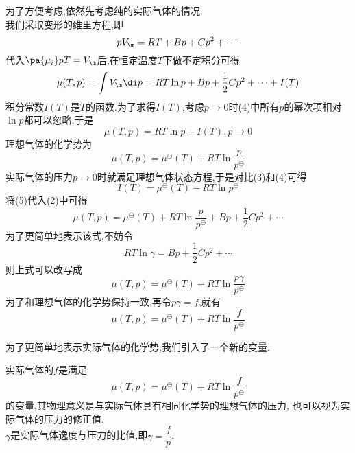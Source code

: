 \documentclass{ctexart}
\begin{document}
\begin{derivation}\setcounter{equation}{0}
    为了方便考虑,依然先考虑纯的实际气体的情况.\\
    我们采取变形的维里方程,即
    \begin{equation}
        pV_{\m}=RT+Bp+Cp^2+\cdots
    \end{equation}
    代入$\pa{\mu_i}pT=V_{\m}$后,在恒定温度$T$下做不定积分可得
    \begin{equation}
        \mu(T,p)=\int{V_\m}\di p=RT\ln p+Bp+\dfrac12Cp^2+\cdots+I(T)
    \end{equation}
    积分常数$I(T)$是$T$的函数.为了求得$I(T)$,考虑$p\to0$时(4)中所有$p$的幂次项相对$\ln p$都可以忽略,于是
    \begin{equation}
        \mu(T,p)=RT\ln p+I(T),p\to0
    \end{equation}
    理想气体的化学势为
    \begin{equation}
        \mu(T,p)=\mu^\ominus(T)+RT\ln\dfrac{p}{p^\ominus}
    \end{equation}
    实际气体的压力$p\to0$时就满足理想气体状态方程,于是对比(3)和(4)可得
    \begin{equation}
        I(T)=\mu^\ominus(T)-RT\ln p^\ominus
    \end{equation}
    将(5)代入(2)中可得
    \begin{equation}
        \mu(T,p)=\mu^\ominus(T)+RT\ln\dfrac{p}{p^\ominus}+Bp+\dfrac12Cp^2+\cdots
    \end{equation}
    为了更简单地表示该式,不妨令
    \begin{equation}
        RT\ln\gamma=Bp+\dfrac12Cp^2+\cdots
    \end{equation}
    则上式可以改写成
    \begin{equation}
        \mu(T,p)=\mu^\ominus(T)+RT\ln\dfrac{p\gamma}{p^\ominus}
    \end{equation}
    为了和理想气体的化学势保持一致,再令$p\gamma=f$,就有
    \begin{equation}
        \mu(T,p)=\mu^\ominus(T)+RT\ln\dfrac{f}{p^\ominus}
    \end{equation}

\end{derivation}
为了更简单地表示实际气体的化学势,我们引入了一个新的变量.
\begin{definition}[4B.4.2 逸度]
    实际气体的$f$是满足
    \[\mu(T,p)=\mu^\ominus(T)+RT\ln\dfrac{f}{p^\ominus}\]
    的变量,其物理意义是与实际气体具有相同化学势的理想气体的压力,%
    也可以视为实际气体的压力的修正值.\\
    $\gamma$是实际气体逸度与压力的比值,即$\gamma=\dfrac{f}{p}$.
\end{definition}
\end{document}
